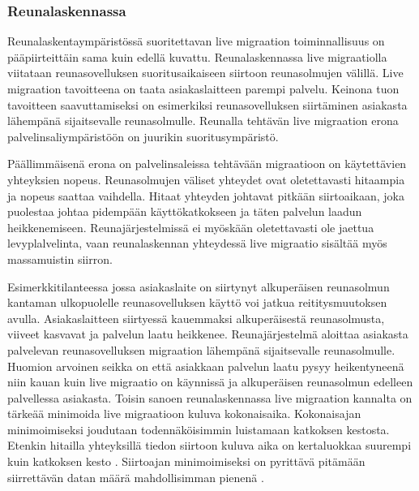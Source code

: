 \subsubsection*{Reunalaskennassa}
Reunalaskentaympäristössä suoritettavan live migraation toiminnallisuus on pääpiirteittäin sama kuin edellä kuvattu.
Reunalaskennassa live migraatiolla viitataan reunasovelluksen suoritusaikaiseen siirtoon reunasolmujen välillä.
Live migraation tavoitteena on taata asiakaslaitteen parempi palvelu.
Keinona tuon tavoitteen saavuttamiseksi on esimerkiksi reunasovelluksen siirtäminen asiakasta lähempänä sijaitsevalle reunasolmulle. Reunalla tehtävän live migraation erona palvelinsaliympäristöön on juurikin suoritusympäristö. 

Päällimmäisenä erona on palvelinsaleissa tehtävään migraatioon on käytettävien yhteyksien nopeus. Reunasolmujen väliset yhteydet ovat oletettavasti hitaampia ja nopeus saattaa vaihdella\cite{ha2017you}.
Hitaat yhteyden johtavat pitkään siirtoaikaan, joka puolestaa johtaa pidempään käyttökatkokseen ja täten palvelun laadun heikkenemiseen. 
Reunajärjestelmissä ei myöskään oletettavasti ole jaettua levyplalvelinta, vaan reunalaskennan yhteydessä live migraatio sisältää myös massamuistin siirron.

Esimerkkitilanteessa jossa asiakaslaite on siirtynyt alkuperäisen reunasolmun kantaman ulkopuolelle reunasovelluksen käyttö voi jatkua reititysmuutoksen avulla. Asiakaslaitteen siirtyessä kauemmaksi alkuperäisestä reunasolmusta, viiveet kasvavat ja palvelun laatu heikkenee. Reunajärjestelmä aloittaa asiakasta palvelevan reunasovelluksen migraation lähempänä sijaitsevalle reunasolmulle.
Huomion arvoinen seikka on että asiakkaan palvelun laatu pysyy heikentyneenä niin kauan kuin live migraatio on käynnissä ja alkuperäisen reunasolmun edelleen palvellessa asiakasta. 
Toisin sanoen reunalaskennassa live migraation kannalta on tärkeää minimoida live migraatioon kuluva kokonaisaika. 
Kokonaisajan minimoimiseksi joudutaan todennäköisimmin luistamaan katkoksen kestosta. 
Etenkin hitailla yhteyksillä tiedon siirtoon kuluva aika on kertaluokkaa suurempi kuin katkoksen kesto \cite{ha2017you}.
Siirtoajan minimoimiseksi on pyrittävä pitämään siirrettävän datan määrä mahdollisimman pienenä \cite{ha2015adaptive}.





